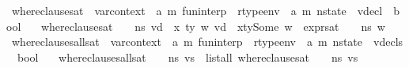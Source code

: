 \begin{isabellebody}
\isanewline
{}\isamarkupfalse%
\ where{\isacharunderscore}{\kern0pt}clause{\isacharunderscore}{\kern0pt}sat\ {\isacharcolon}{\kern0pt}{\isacharcolon}{\kern0pt}\ {\isachardoublequoteopen}var{\isacharunderscore}{\kern0pt}context\ {\isasymRightarrow}\ {\isacharparenleft}{\kern0pt}{\isacharprime}{\kern0pt}a{\isacharcomma}{\kern0pt}\ {\isacharprime}{\kern0pt}m{\isacharparenright}{\kern0pt}\ fun{\isacharunderscore}{\kern0pt}interp\ {\isasymRightarrow}\ rtype{\isacharunderscore}{\kern0pt}env\ {\isacharequal}{\kern0pt}{\isachargreater}{\kern0pt}\ {\isacharparenleft}{\kern0pt}{\isacharprime}{\kern0pt}a{\isacharcomma}{\kern0pt}\ {\isacharprime}{\kern0pt}m{\isacharparenright}{\kern0pt}\ nstate\ {\isasymRightarrow}\ vdecl\ {\isasymRightarrow}\ bool{\isachardoublequoteclose}\isanewline
\ \ \ {\isachardoublequoteopen}where{\isacharunderscore}{\kern0pt}clause{\isacharunderscore}{\kern0pt}sat\ {\isasymLambda}\ {\isasymGamma}\ {\isasymOmega}\ n{\isacharunderscore}{\kern0pt}s\ vd\ {\isacharequal}{\kern0pt}\ {\isacharparenleft}{\kern0pt}{\isasymforall}x\ ty\ w{\isachardot}{\kern0pt}\ vd\ {\isacharequal}{\kern0pt}\ {\isacharparenleft}{\kern0pt}x{\isacharcomma}{\kern0pt}ty{\isacharcomma}{\kern0pt}Some\ w{\isacharparenright}{\kern0pt}\ {\isasymlongrightarrow}\ expr{\isacharunderscore}{\kern0pt}sat\ {\isasymLambda}\ {\isasymGamma}\ {\isasymOmega}\ n{\isacharunderscore}{\kern0pt}s\ w{\isacharparenright}{\kern0pt}{\isachardoublequoteclose}\isanewline
\isanewline
{}\isamarkupfalse%
\ where{\isacharunderscore}{\kern0pt}clauses{\isacharunderscore}{\kern0pt}all{\isacharunderscore}{\kern0pt}sat\ {\isacharcolon}{\kern0pt}{\isacharcolon}{\kern0pt}\ {\isachardoublequoteopen}var{\isacharunderscore}{\kern0pt}context\ {\isasymRightarrow}\ {\isacharparenleft}{\kern0pt}{\isacharprime}{\kern0pt}a{\isacharcomma}{\kern0pt}\ {\isacharprime}{\kern0pt}m{\isacharparenright}{\kern0pt}\ fun{\isacharunderscore}{\kern0pt}interp\ {\isasymRightarrow}\ rtype{\isacharunderscore}{\kern0pt}env\ {\isacharequal}{\kern0pt}{\isachargreater}{\kern0pt}\ {\isacharparenleft}{\kern0pt}{\isacharprime}{\kern0pt}a{\isacharcomma}{\kern0pt}\ {\isacharprime}{\kern0pt}m{\isacharparenright}{\kern0pt}\ nstate\ {\isasymRightarrow}\ vdecls\ {\isasymRightarrow}\ bool{\isachardoublequoteclose}\isanewline
\ \ \ {\isachardoublequoteopen}where{\isacharunderscore}{\kern0pt}clauses{\isacharunderscore}{\kern0pt}all{\isacharunderscore}{\kern0pt}sat\ {\isasymLambda}\ {\isasymGamma}\ {\isasymOmega}\ n{\isacharunderscore}{\kern0pt}s\ vs\ {\isacharequal}{\kern0pt}\ list{\isacharunderscore}{\kern0pt}all\ {\isacharparenleft}{\kern0pt}where{\isacharunderscore}{\kern0pt}clause{\isacharunderscore}{\kern0pt}sat\ {\isasymLambda}\ {\isasymGamma}\ {\isasymOmega}\ n{\isacharunderscore}{\kern0pt}s{\isacharparenright}{\kern0pt}\ vs{\isachardoublequoteclose}\isanewline

\end{isabellebody}
